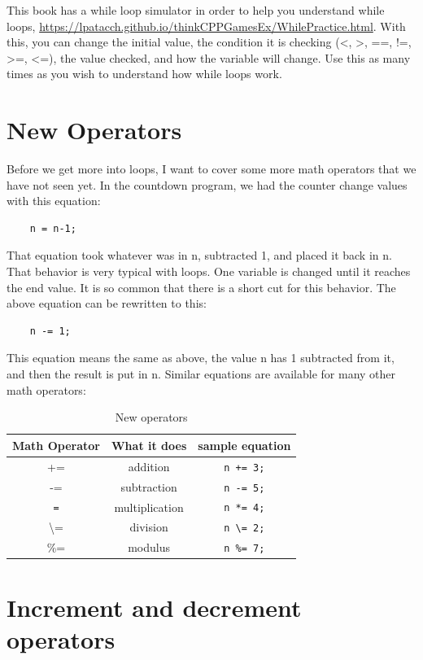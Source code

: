 This book has a while loop simulator in order to help you understand while loops, \url{https://lpatacch.github.io/thinkCPPGamesEx/WhilePractice.html}. 
With this, you can change the 
initial value, the condition it is checking (\textless, \textgreater, ==, !=, \textgreater=, \textless=), the value checked,
and how the variable will change. Use this as many times as you wish
to understand how while loops work.
\section{New Operators}
\label{plusequal}

Before we get more into loops, I want to cover some more math operators that we have not seen yet. In the countdown program, we had the counter change values with this equation:
\begin{verbatim}
    n = n-1;
\end{verbatim}
That equation took whatever was in n, subtracted 1, and placed it back in n. That behavior is very typical with loops. One variable 
is changed until it reaches the end value. It is so common that there is a short cut for this behavior. The above equation can be rewritten to this:
\begin{verbatim}
    n -= 1;
\end{verbatim}
This equation means the same as above, the value n has 1 subtracted from it, and then the result is put in n. Similar equations are available for many other math operators:
\begin{table}[h]
    \centering
    \begin{tabular}{|c|c|c|}
    \hline
 Math Operator & What it does & sample equation \\\hline
    +=     &  addition & {\tt n += 3;} \\
    -=      & subtraction & {\tt n -= 5;}\\
    {\tt *=}  &   multiplication & {\tt n *= 4;} \\
    \textbackslash=  &    division  & {\tt n \textbackslash= 2;}\\
    \%=  &  modulus & {\tt n \%= 7;}\\
\hline
    \end{tabular}
    \caption{New operators}
    \label{tab:newoperators}
\end{table}
\section{Increment and decrement operators}

